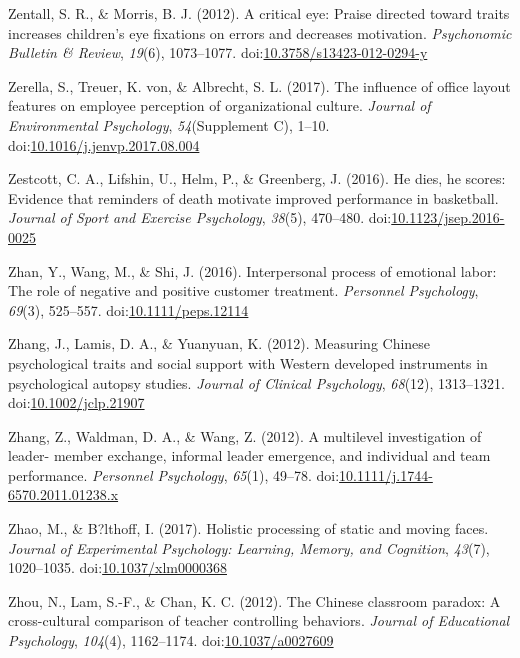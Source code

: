 \documentclass[english,man]{apa6}
\theoremstyle{definition}
\theoremstyle{definition}
\theoremstyle{definition}
\theoremstyle{remark}
\begin{document}
\hypertarget{ref-Zentall2012}{}
Zentall, S. R., \& Morris, B. J. (2012). A critical eye: Praise directed
toward traits increases children's eye fixations on errors and decreases
motivation. \emph{Psychonomic Bulletin \& Review}, \emph{19}(6),
1073--1077.
doi:\href{https://doi.org/10.3758/s13423-012-0294-y}{10.3758/s13423-012-0294-y}

\hypertarget{ref-Zerella2017}{}
Zerella, S., Treuer, K. von, \& Albrecht, S. L. (2017). The influence of
office layout features on employee perception of organizational culture.
\emph{Journal of Environmental Psychology}, \emph{54}(Supplement C),
1--10.
doi:\href{https://doi.org/10.1016/j.jenvp.2017.08.004}{10.1016/j.jenvp.2017.08.004}

\hypertarget{ref-Zestcott2016}{}
Zestcott, C. A., Lifshin, U., Helm, P., \& Greenberg, J. (2016). He
dies, he scores: Evidence that reminders of death motivate improved
performance in basketball. \emph{Journal of Sport and Exercise
Psychology}, \emph{38}(5), 470--480.
doi:\href{https://doi.org/10.1123/jsep.2016-0025}{10.1123/jsep.2016-0025}

\hypertarget{ref-Zhan2016}{}
Zhan, Y., Wang, M., \& Shi, J. (2016). Interpersonal process of
emotional labor: The role of negative and positive customer treatment.
\emph{Personnel Psychology}, \emph{69}(3), 525--557.
doi:\href{https://doi.org/10.1111/peps.12114}{10.1111/peps.12114}

\hypertarget{ref-Zhang2012a}{}
Zhang, J., Lamis, D. A., \& Yuanyuan, K. (2012). Measuring Chinese
psychological traits and social support with Western developed
instruments in psychological autopsy studies. \emph{Journal of Clinical
Psychology}, \emph{68}(12), 1313--1321.
doi:\href{https://doi.org/10.1002/jclp.21907}{10.1002/jclp.21907}

\hypertarget{ref-Zhang2012}{}
Zhang, Z., Waldman, D. A., \& Wang, Z. (2012). A multilevel
investigation of leader- member exchange, informal leader emergence, and
individual and team performance. \emph{Personnel Psychology},
\emph{65}(1), 49--78.
doi:\href{https://doi.org/10.1111/j.1744-6570.2011.01238.x}{10.1111/j.1744-6570.2011.01238.x}

\hypertarget{ref-Zhao2017}{}
Zhao, M., \& B?lthoff, I. (2017). Holistic processing of static and
moving faces. \emph{Journal of Experimental Psychology: Learning,
Memory, and Cognition}, \emph{43}(7), 1020--1035.
doi:\href{https://doi.org/10.1037/xlm0000368}{10.1037/xlm0000368}

\hypertarget{ref-Zhou2012}{}
Zhou, N., Lam, S.-F., \& Chan, K. C. (2012). The Chinese classroom
paradox: A cross-cultural comparison of teacher controlling behaviors.
\emph{Journal of Educational Psychology}, \emph{104}(4), 1162--1174.
doi:\href{https://doi.org/10.1037/a0027609}{10.1037/a0027609}
\end{document}
